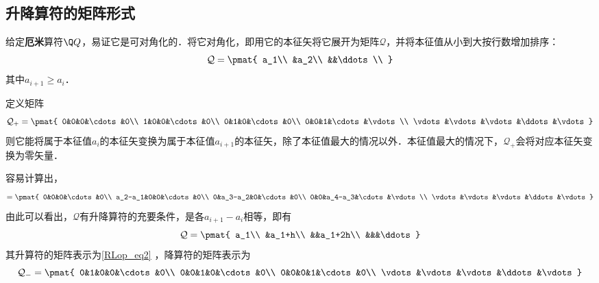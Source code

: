 \subsection{升降算符的矩阵形式}

给定\textbf{厄米}算符$\Q Q$，易证它是可对角化的．将它对角化，即用它的本征矢将它展开为矩阵$\mathcal{Q}$，并将本征值从小到大按行数增加排序：
\begin{equation}
\mathcal{Q}=
\pmat{
    a_1\\
    &a_2\\
    &&\ddots\\
}
\end{equation}
其中$a_{i+1}\geq a_i$．

定义矩阵
\begin{equation}\label{RLop_eq2}
\mathcal{Q}_+ = 
\pmat{
    0&0&0&\cdots&0\\
    1&0&0&\cdots&0\\
    0&1&0&\cdots&0\\
    0&0&1&\cdots&\vdots\\
    \vdots&\vdots&\vdots&\ddots&\vdots
}
\end{equation}
则它能将属于本征值$a_i$的本征矢变换为属于本征值$a_{i+1}$的本征矢，除了本征值最大的情况以外．本征值最大的情况下，$\mathcal{Q}_+$会将对应本征矢变换为零矢量．

容易计算出，
\begin{equation}
[\mathcal{Q}, \mathcal{Q}_+]=
\pmat{
    0&0&0&\cdots&0\\
    a_2-a_1&0&0&\cdots&0\\
    0&a_3-a_2&0&\cdots&0\\
    0&0&a_4-a_3&\cdots&\vdots\\
    \vdots&\vdots&\vdots&\ddots&\vdots
}
\end{equation}
由此可以看出，$\mathcal{Q}$有升降算符的充要条件，是各$a_{i+1}-a_i$相等，即有
\begin{equation}
\mathcal{Q}=\pmat{
    a_1\\
    &a_1+h\\
    &&a_1+2h\\
    &&&\ddots
}
\end{equation}
其升算符的矩阵表示为\autoref{RLop_eq2} ，降算符的矩阵表示为
\begin{equation}
\mathcal{Q}_- = 
\pmat{
    0&1&0&0&\cdots&0\\
    0&0&1&0&\cdots&0\\
    0&0&0&1&\cdots&0\\
    \vdots&\vdots&\vdots&\ddots&\vdots
}
\end{equation}
























